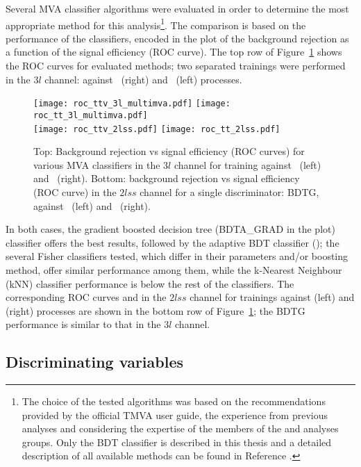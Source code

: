 Several MVA classifier algorithms were evaluated in order to determine the most appropriate method for this analysis\footnote{The choice of the tested algorithms was based on the recommendations provided by the official TMVA user guide, the experience from previous analyses and considering the expertise of the members of the \tHq and \ttH analyses groups. Only the BDT classifier is described in this thesis and a detailed description of all available methods can be found in Reference \cite{tmva}.}. The comparison is based on the performance of the classifiers, encoded in the plot of the background rejection as a function of the signal efficiency (ROC curve). The top row of Figure~\ref{roc} shows the ROC curves for evaluated methods; two separated trainings were performed in the $3l$ channel: against \ttbar\ (right) and \ttV\ (left) processes.

\begin{figure} [!h]
  \centering
   \texttt{[image: roc\_ttv\_3l\_multimva.pdf]}
   \texttt{[image: roc\_tt\_3l\_multimva.pdf]} \\
   \texttt{[image: roc\_ttv\_2lss.pdf]}
   \texttt{[image: roc\_tt\_2lss.pdf]} 

\caption[MVA classifiers performance.]{ Top: Background rejection vs signal efficiency (ROC curves) for various MVA classifiers in the $3l$ channel for training against \ttV\ (left) and \ttbar\ (right). Bottom: background rejection vs signal efficiency (ROC curve) in the $2lss$ channel for a single discriminator: BDTG, against \ttV\ (left) and \ttbar\ (right).}
\label{roc}
\end{figure} 

In both cases, the gradient boosted decision tree  (BDTA\_GRAD in the plot) classifier offers the best results, followed by the adaptive BDT classifier (); the several Fisher classifiers tested, which differ in their parameters and/or boosting method, offer similar performance among them, while the k-Nearest Neighbour (kNN) classifier performance is below the rest of the classifiers. The corresponding ROC curves and in the $2lss$ channel for trainings against \ttV (left) and \ttbar (right) processes are shown in the bottom row of Figure~\ref{roc}; the BDTG performance is similar to that in the $3l$ channel.

\subsection{Discriminating variables}

